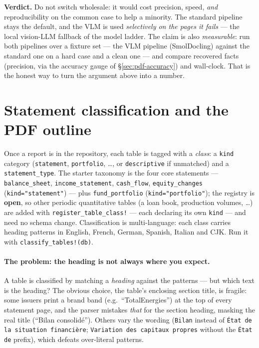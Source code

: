 \documentclass[11pt,a4paper]{report}
\begin{document}
\noindent\textbf{Verdict.} Do not switch wholesale: it would cost precision, speed, \emph{and} reproducibility
on the common case to help a minority. The standard pipeline stays the default, and the VLM is used
\emph{selectively on the pages it fails} --- the local vision-LLM fallback of the model ladder. The claim is
also \emph{measurable}: run both pipelines over a fixture set --- the VLM pipeline (SmolDocling) against the
standard one on a hard case and a clean one --- and compare recovered facts (precision, via the accuracy gauge
of \S\ref{sec:pdf-accuracy}) and wall-clock. That is the honest way to turn the argument above into a number.

\section{Statement classification and the PDF outline}
\label{sec:pdf-classification}

Once a report is in the repository, each table is tagged with a \emph{class}: a \texttt{kind} category
(\texttt{statement}, \texttt{portfolio}, …, or \texttt{descriptive} if unmatched) and a
\texttt{statement\_type}. The starter taxonomy is the four core statements --- \texttt{balance\_sheet},
\texttt{income\_statement}, \texttt{cash\_flow}, \texttt{equity\_changes} (\texttt{kind="statement"}) ---
plus \texttt{fund\_portfolio} (\texttt{kind="portfolio"}); the registry is \textbf{open}, so other periodic
quantitative tables (a loan book, production volumes, …) are added with \texttt{register\_table\_class!} ---
each declaring its own \texttt{kind} --- and need no schema change. Classification is multi-language: each class carries heading patterns in
English, French, German, Spanish, Italian and CJK. Run it with \texttt{classify\_tables!(db)}.

\paragraph{The problem: the heading is not always where you expect.} A table is classified by matching a
\emph{heading} against the patterns --- but which text is the heading? The obvious choice, the table's
enclosing section title, is fragile: some issuers print a brand band (e.g.\ ``TotalEnergies'') at the top
of every statement page, and the parser mistakes \emph{that} for the section heading, masking the real
title (``Bilan consolidé''). Others vary the wording (\texttt{Bilan} instead of \texttt{État de la
situation financière}; \texttt{Variation des capitaux propres} without the \texttt{État de} prefix), which
defeats over-literal patterns.
\end{document}
